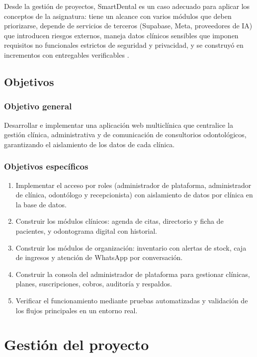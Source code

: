\documentclass[11pt]{article}
\begin{document}
Desde la gestión de proyectos, SmartDental es un caso adecuado para aplicar los conceptos de la asignatura: tiene un alcance con varios módulos que deben priorizarse, depende de servicios de terceros (Supabase, Meta, proveedores de IA) que introducen riesgos externos, maneja datos clínicos sensibles que imponen requisitos no funcionales estrictos de seguridad y privacidad, y se construyó en incrementos con entregables verificables \parencite{pmi2021,sommerville2016}.

\subsection{Objetivos}

\subsubsection*{Objetivo general}
Desarrollar e implementar una aplicación web multiclínica que centralice la gestión clínica, administrativa y de comunicación de consultorios odontológicos, garantizando el aislamiento de los datos de cada clínica.

\subsubsection*{Objetivos específicos}
\begin{enumerate}[label=\textbf{OE\arabic*.},leftmargin=3.2em]
  \item Implementar el acceso por roles (administrador de plataforma, administrador de clínica, odontólogo y recepcionista) con aislamiento de datos por clínica en la base de datos.
  \item Construir los módulos clínicos: agenda de citas, directorio y ficha de pacientes, y odontograma digital con historial.
  \item Construir los módulos de organización: inventario con alertas de stock, caja de ingresos y atención de WhatsApp por conversación.
  \item Construir la consola del administrador de plataforma para gestionar clínicas, planes, suscripciones, cobros, auditoría y respaldos.
  \item Verificar el funcionamiento mediante pruebas automatizadas y validación de los flujos principales en un entorno real.
\end{enumerate}

\section{Gestión del proyecto}
\end{document}
